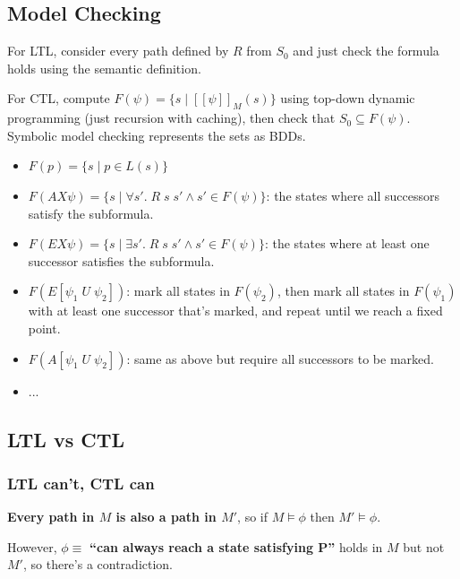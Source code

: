 \documentclass[a4paper, 11pt]{article}
\newcommand{\interp}[2][]{\mathcal{#1}[\![#2]\!]}
\begin{document}
{    \subsection*{Model Checking}
    {
        For LTL, consider every path defined by \(R\) from \(S_0\) and just check the formula holds using the semantic definition.

        For CTL, compute \(F(\psi) = \{s \mid \interp{\psi}_M(s)\}\) using top-down dynamic programming (just recursion with caching), then check that \(S_0 \subseteq F(\psi)\). Symbolic model checking represents the sets as BDDs.
        \begin{itemize}
        \item \(F(p) = \{s \mid p \in L(s)\}\)
        \item \(F(AX \psi) = \{s \mid \forall s'.\; R\;s\;s' \wedge s' \in F(\psi)\}\): the states where all successors satisfy the subformula.
        \item \(F(EX \psi) = \{s \mid \exists s'.\; R\;s\;s' \wedge s' \in F(\psi)\}\): the states where at least one successor satisfies the subformula.
        \item \(F(E[\psi_1\;U\;\psi_2])\): mark all states in \(F(\psi_2)\), then mark all states in \(F(\psi_1)\) with at least one successor that's marked, and repeat until we reach a fixed point.
        \item \(F(A[\psi_1\;U\;\psi_2])\): same as above but require all successors to be marked.
        \item ...
        \end{itemize}
    }
    \subsection*{LTL vs CTL}
    {
        \subsubsection*{LTL can't, CTL can}
        {
            \begin{minipage}[t]{0.7\textwidth}
            \textbf{Every path in \(M\) is also a path in \(M'\)}, so if \(M\vDash\phi\) then \(M'\vDash\phi\).

            However, \(\phi \equiv\) \textbf{``can always reach a state satisfying P''} holds in \(M\) but not \(M'\), so there's a contradiction.


\end{minipage}}}}
\end{document}
